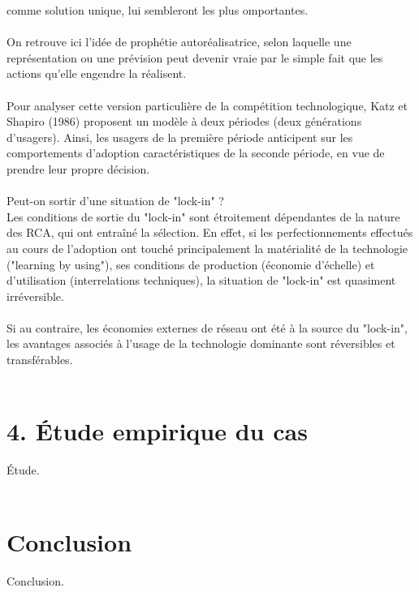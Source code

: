 \documentclass[a4paper, 10pt]{article}
\begin{document}
comme solution unique, lui sembleront les plus omportantes.\\ \\
On retrouve ici l'idée de prophétie autoréalisatrice,
selon laquelle une représentation ou une prévision peut devenir vraie par le simple fait que les actions qu'elle engendre la réalisent.\\ \\
Pour analyser cette version particulière de la compétition technologique,
Katz et Shapiro (1986) proposent un modèle à deux périodes (deux générations d'usagers).
Ainsi, les usagers de la première période anticipent sur les comportements d'adoption caractéristiques de la seconde période,
en vue de prendre leur propre décision.\\ \\
Peut-on sortir d'une situation de "lock-in" ?\\
Les conditions de sortie du "lock-in" sont étroitement dépendantes de la nature des RCA, qui ont entraîné la sélection.
En effet, si les perfectionnements effectués au cours de l'adoption ont touché principalement la matérialité de la technologie
("learning by using"), ses conditions de production (économie d'échelle) et d'utilisation (interrelations techniques),
la situation de "lock-in" est quasiment irréversible.\\ \\
Si au contraire, les économies externes de réseau ont été à la source du "lock-in",
les avantages associés à l'usage de la technologie dominante sont réversibles et transférables.\\ \\

\section*{4. Étude empirique du cas}
\indent

Étude.\\ \\

\section*{Conclusion}
\indent

Conclusion.\\ \\

\newpage
\end{document}
